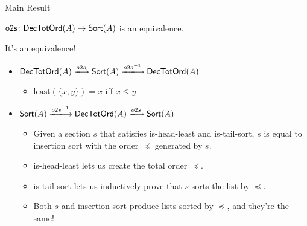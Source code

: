 \documentclass[9pt]{beamer}
\begin{document}
\begin{frame}{Main Result}

\begin{tblock}
    $\operatorname{\mathsf{o2s}}\colon \mathsf{DecTotOrd}(A) \to \mathsf{Sort}(A)$ is an equivalence.
\end{tblock}

It's an equivalence!
\begin{itemize}
    \item $\type{DecTotOrd}(A) \xto{o2s} \type{Sort}(A) \xto{o2s^{-1}} \type{DecTotOrd}(A)$
    \begin{itemize}
        \item $\text{least}(\{x, y\}) = x \text{ iff } x \leq y$
    \end{itemize}

    \item $\type{Sort}(A) \xto{o2s^{-1}} \type{DecTotOrd}(A) \xto{o2s} \type{Sort}(A)$
    \begin{itemize}
        \item Given a section $s$ that satisfies \alert{is-head-least} and \alert{is-tail-sort},
              $s$ is equal to insertion sort with the order $\preceq$ generated by $s$.
        \item \alert{is-head-least} lets us create the \alert{total order} $\preceq$.
        \item \alert{is-tail-sort} lets us inductively prove that $s$ \alert{sorts} the list by $\preceq$.
        \item Both $s$ and insertion sort produce lists sorted by $\preceq$, and they're the same!
    \end{itemize}
\end{itemize}

\end{frame}
\end{document}
